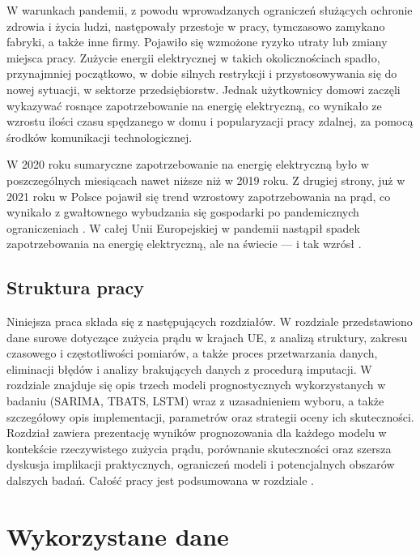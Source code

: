 \documentclass[polish, twoside, 12pt, a4paper]{article}
\theoremstyle{definition}
\theoremstyle{plain}
\theoremstyle{remark}
\begin{document}
W warunkach pandemii, z powodu wprowadzanych ograniczeń służących ochronie zdrowia i życia ludzi, następowały przestoje w pracy, tymczasowo zamykano fabryki, a także inne firmy. Pojawiło się wzmożone ryzyko utraty lub zmiany miejsca pracy. Zużycie energii elektrycznej w takich okolicznościach spadło, przynajmniej początkowo, w dobie silnych restrykcji i przystosowywania się do nowej sytuacji, w sektorze przedsiębiorstw. Jednak użytkownicy domowi zaczęli wykazywać rosnące zapotrzebowanie na energię elektryczną, co wynikało ze wzrostu ilości czasu spędzanego w domu i popularyzacji pracy zdalnej, za pomocą środków komunikacji technologicznej. 

W 2020 roku sumaryczne zapotrzebowanie na energię elektryczną było w poszczególnych miesiącach nawet niższe niż w 2019 roku. Z drugiej strony, już w 2021 roku w Polsce pojawił się trend wzrostowy zapotrzebowania na prąd, co wynikało z gwałtownego wybudzania się gospodarki po pandemicznych ograniczeniach \citep{smyk2021}. W całej Unii Europejskiej w pandemii nastąpił spadek zapotrzebowania na energię elektryczną, ale na świecie --- i tak wzrósł \citep{maciuch2023}. 

\subsection{Struktura pracy}

Niniejsza praca składa się z następujących rozdziałów. W rozdziale \textit{} przedstawiono dane surowe dotyczące zużycia prądu w krajach UE, z analizą struktury, zakresu czasowego i częstotliwości pomiarów, a także proces przetwarzania danych, eliminacji błędów i analizy brakujących danych z procedurą imputacji. W rozdziale \textit{} znajduje się opis trzech modeli prognostycznych wykorzystanych w badaniu (SARIMA, TBATS, LSTM) wraz z uzasadnieniem wyboru, a także szczegółowy opis implementacji, parametrów oraz strategii oceny ich skuteczności. Rozdział \textit{} zawiera prezentację wyników prognozowania dla każdego modelu w kontekście rzeczywistego zużycia prądu, porównanie skuteczności oraz szersza dyskusja implikacji praktycznych, ograniczeń modeli i potencjalnych obszarów dalszych badań. Całość pracy jest podsumowana w rozdziale \textit{}.


\clearpage
\section{Wykorzystane dane}\label{sec:dane}
\end{document}
